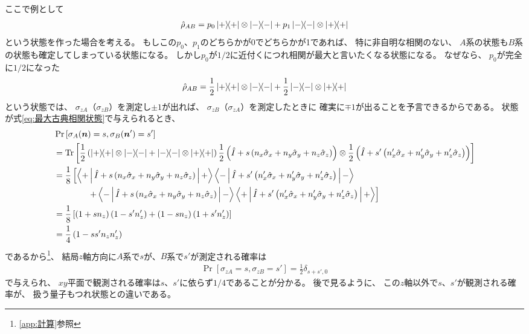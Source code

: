 \documentclass[a4paper, 10pt]{jsarticle}
\begin{document}
ここで例として
\begin{align}
	\hat{\rho}_{AB}
	= p_0 \Ketbra{+}{+} \otimes \Ketbra{-}{-}
	+ p_1 \Ketbra{-}{-} \otimes \Ketbra{+}{+}
\end{align}
という状態を作った場合を考える。
もしこの$p_0$、$p_1$のどちらかが0でどちらかが1であれば、
特に非自明な相関のない、
$A$系の状態も$B$系の状態も確定してしまっている状態になる。
しかし$p_0$が$1/2$に近付くにつれ相関が最大と言いたくなる状態になる。
なぜなら、
$p_0$が完全に$1/2$になった
\begin{align}
	\hat{\rho}_{AB}
	= \frac{1}{2} \Ketbra{+}{+} \otimes \Ketbra{-}{-}
	+ \frac{1}{2} \Ketbra{-}{-} \otimes \Ketbra{+}{+}
	\label{eq:最大古典相関状態}
\end{align}
という状態では、
$\sigma_{zA}$（$\sigma_{zB}$）を測定し$\pm 1$が出れば、
$\sigma_{zB}$（$\sigma_{zA}$）を測定したときに
確実に$\mp 1$が出ることを予言できるからである。
状態が式\eqref{eq:最大古典相関状態}で与えられるとき、
\begin{align}
	&\Pr \left[ \sigma_A (\vec{n}) = s, \sigma_B (\vec{n}') = s' \right] \\
	&= \Tr \left[ \frac{1}{2} \left( \Ketbra{+}{+} \otimes \Ketbra{-}{-}
	+ \Ketbra{-}{-} \otimes \Ketbra{+}{+} \right)
	\frac{1}{2} \left( \hat{I} + s \left( n_x \hat{\sigma}_x
	+ n_y \hat{\sigma}_y + n_z \hat{\sigma}_z \right) \right) \otimes
	\frac{1}{2} \left( \hat{I} + s' \left( n'_x \hat{\sigma}_x
	+ n'_y \hat{\sigma}_y + n'_z \hat{\sigma}_z \right) \right) \right] \\
	&= \frac{1}{8} \left[ \Braket{+ | \hat{I} + s \left( n_x \hat{\sigma}_x
	+ n_y \hat{\sigma}_y + n_z \hat{\sigma}_z \right) | +} 
	\Braket{- | \hat{I} + s' \left( n'_x \hat{\sigma}_x
	+ n'_y \hat{\sigma}_y + n'_z \hat{\sigma}_z \right) | -} \right. \\
	&\qquad \qquad \left. + \Braket{- | \hat{I} + s \left( n_x \hat{\sigma}_x
	+ n_y \hat{\sigma}_y + n_z \hat{\sigma}_z \right) | -}
	\Braket{+ | \hat{I} + s' \left( n'_x \hat{\sigma}_x
	+ n'_y \hat{\sigma}_y + n'_z \hat{\sigma}_z \right) | +} \right] \\
	&= \frac{1}{8} \left[ \left( 1 + sn_z \right) \left( 1  - s' n'_z \right)
	+ \left( 1 - sn_z \right) \left( 1 + s' n'_z \right) \right] \\
	&= \frac{1}{4} \left( 1 - ss' n_z n'_z \right)
\end{align}
であるから\footnote{\ref{app:計算}参照}、
結局$z$軸方向に$A$系で$s$が、$B$系で$s'$が測定される確率は
\begin{align}
	\Pr \left[ \sigma_{zA} = s, \sigma_{zB} = s' \right]
	= \frac{1}{2} \delta_{s+s', 0}
\end{align}
で与えられ、
$xy$平面で観測される確率は$s$、$s'$に依らず$1/4$であることが分かる。
後で見るように、
この$z$軸以外で$s$、$s'$が観測される確率が、
扱う量子もつれ状態との違いである。
\end{document}
